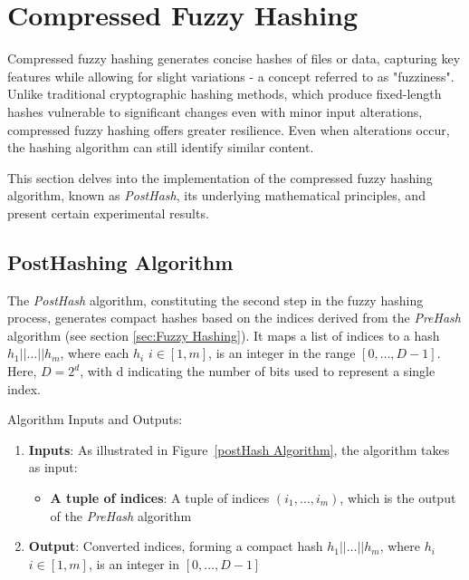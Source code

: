 \newpage


\section{Compressed Fuzzy Hashing}
\label{sec:Compressed Fuzzy Hashing}

Compressed fuzzy hashing generates concise hashes of files or data, capturing key features while allowing for slight variations - a concept referred to as "fuzziness". Unlike traditional cryptographic hashing methods, which produce fixed-length hashes vulnerable to significant changes even with minor input alterations, compressed fuzzy hashing offers greater resilience. Even when alterations occur, the hashing algorithm can still identify similar content. 

This section delves into the implementation of the compressed fuzzy hashing algorithm, known as \textit{PostHash}, its underlying mathematical principles, and present certain experimental results.

\subsection{PostHashing Algorithm}

The \textit{PostHash} algorithm, constituting the second step in the fuzzy hashing process, generates compact hashes based on the indices derived from the \textit{PreHash} algorithm (see section \ref{sec:Fuzzy Hashing}). It maps a list of indices to a hash \(h_1|| \ldots || h_m\), where each \(h_i\) \(i \in [1, m]\), is an integer in the range \([0, \ldots, D-1]\). Here, \(D = 2^d\), with d indicating the number of bits used to represent a single index. 

Algorithm Inputs and Outputs:
\begin{enumerate}
    \item \textbf{Inputs}: As illustrated in Figure~\ref{postHash Algorithm}, the algorithm takes as input:
    \begin{itemize}
        \item \textbf{A tuple of indices}: A tuple of indices \((i_1, \ldots, i_m)\), which is the output of the \textit{PreHash} algorithm
    \end{itemize}
    \item \textbf{Output}: Converted indices, forming a compact hash \(h_1|| \ldots || h_m\), where \(h_i\) \(i \in [1, m]\), is an integer in \([0, \ldots, D-1]\)
\end{enumerate} 

